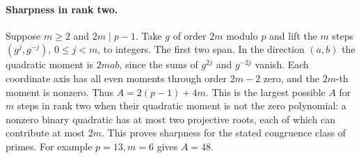 \paragraph{Sharpness in rank two.}
Suppose $m\ge2$ and $2m\mid p-1$. Take $g$ of order $2m$ modulo $p$
and lift the $m$ steps $(g^j,g^{-j})$, $0\le j<m$, to integers.
The first two span. In the direction $(a,b)$ the quadratic moment is
$2mab$, since the sums of $g^{2j}$ and $g^{-2j}$ vanish. Each coordinate
axis has all even moments through order $2m-2$ zero, and the $2m$-th moment is
nonzero. Thus $A=2(p-1)+4m$. This is the largest possible $A$ for
$m$ steps in rank two when their quadratic moment is not the zero polynomial:
a nonzero binary quadratic has at most two projective roots, each of
which can contribute at most $2m$. This proves sharpness for the stated
congruence class of primes. For example $p=13,m=6$ gives $A=48$.
